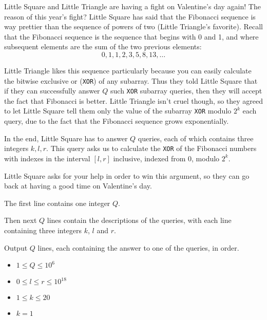\documentclass[11pt,a4paper,oneside]{article}
\begin{document}

Little Square and Little Triangle are having a fight on Valentine's day again! The reason of this year's fight? Little Square has said that the Fibonacci sequence is way prettier than the sequence of powers of two (Little Triangle's favorite). Recall that the Fibonacci sequence is the sequence that begins with 0 and 1, and where subsequent elements are the sum of the two previous elements:
\[
0, 1, 1, 2, 3, 5, 8, 13, \ldots
\]

Little Triangle likes this sequence particularly because you can easily calculate the bitwise exclusive or (\texttt{XOR}) of any subarray. Thus they told Little Square that if they can successfully answer $Q$ such \texttt{XOR} subarray queries, then they will accept the fact that Fibonacci is better. Little Triangle isn't cruel though, so they agreed to let Little Square tell them only the value of the subarray \texttt{XOR} modulo $2^k$ each query, due to the fact that the Fibonacci sequence grows exponentially.

In the end, Little Square has to answer $Q$ queries, each of which contains three integers $k, l, r$. This query asks us to calculate the \texttt{XOR} of the Fibonacci numbers with indexes in the interval $[l,r]$ inclusive, indexed from $0$, modulo $2^k$.

Little Square asks for your help in order to win this argument, so they can go back at having a good time on Valentine's day.


The first line contains one integer $Q$.

Then next $Q$ lines contain the descriptions of the queries, with each line containing three integers $k$, $l$ and $r$.


Output $Q$ lines, each containing the answer to one of the queries, in order.


\begin{itemize}
\item $1 \leq Q \leq 10^{6}$
\item $0 \leq l \leq r \leq 10^{18}$
\item $1 \leq k \leq 20$
\end{itemize}

\begin{itemize}
\item $k = 1$
\end{itemize}
\end{document}
